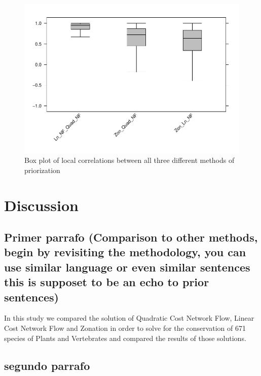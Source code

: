 \documentclass[]{article}
\begin{document}
\begin{figure}
\centering
\includegraphics{NFPaper_files/figure-latex/Boxplot-1.pdf}
\caption{\label{fig:Boxplot}Box plot of local correlations between all three different methods of priorization}
\end{figure}

\hypertarget{discussion}{%
\section{Discussion}\label{discussion}}

\hypertarget{primer-parrafo-comparison-to-other-methods-begin-by-revisiting-the-methodology-you-can-use-similar-language-or-even-similar-sentences-this-is-supposet-to-be-an-echo-to-prior-sentences}{%
\subsection{Primer parrafo (Comparison to other methods, begin by revisiting the methodology, you can use similar language or even similar sentences this is supposet to be an echo to prior sentences)}\label{primer-parrafo-comparison-to-other-methods-begin-by-revisiting-the-methodology-you-can-use-similar-language-or-even-similar-sentences-this-is-supposet-to-be-an-echo-to-prior-sentences}}

In this study we compared the solution of Quadratic Cost Network Flow, Linear Cost Network Flow and Zonation in order to solve for the conservation of 671 species of Plants and Vertebrates and compared the results of those solutions.

\hypertarget{segundo-parrafo}{%
\subsection{segundo parrafo}\label{segundo-parrafo}}
\end{document}
